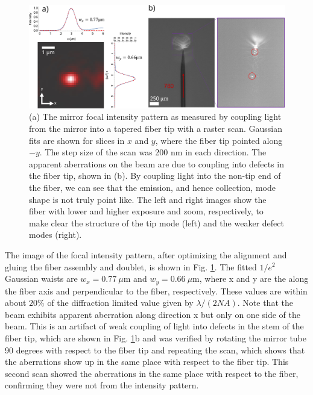 \begin{figure}
    \centering
    \includegraphics[width=\textwidth]{Images/mirror_focus_fiber_scan.pdf}
    \caption{(a) The mirror focal intensity pattern as measured by coupling light from the mirror into a tapered fiber tip with a raster scan. Gaussian fits are shown for slices in $x$ and $y$, where the fiber tip pointed along $-y$. The step size of the scan was 200 nm in each direction. The apparent aberrations on the beam are due to coupling into defects in the fiber tip, shown in (b). By coupling light into the non-tip end of the fiber, we can see that the emission, and hence collection, mode shape is not truly point like. The left and right images show the fiber with lower and higher exposure and zoom, respectively, to make clear the structure of the tip mode (left) and the weaker defect modes (right).}
    \label{fig:mirror_fiber_scan_post_gluing}
\end{figure}

The image of the focal intensity pattern, after optimizing the alignment and gluing the fiber assembly and doublet, is shown in Fig. \ref{fig:mirror_fiber_scan_post_gluing}. The fitted $1/e^2$ Gaussian waists are $w_x=0.77~\mu$m and $w_y = 0.66~\mu$m, where x and y are the along the fiber axis and perpendicular to the fiber, respectively. These values are within about $20\%$ of the diffraction limited value given by $\lambda/(2 NA)$. Note that the beam exhibits apparent aberration along direction x but only on one side of the beam. This is an artifact of weak coupling of light into defects in the stem of the fiber tip, which are shown in Fig.  \ref{fig:mirror_fiber_scan_post_gluing}b and was verified by rotating the mirror tube 90 degrees with respect to the fiber tip and repeating the scan, which shows that the aberrations show up in the same place with respect to the fiber tip. This second scan showed the aberrations in the same place with respect to the fiber, confirming they were not from the intensity pattern.

